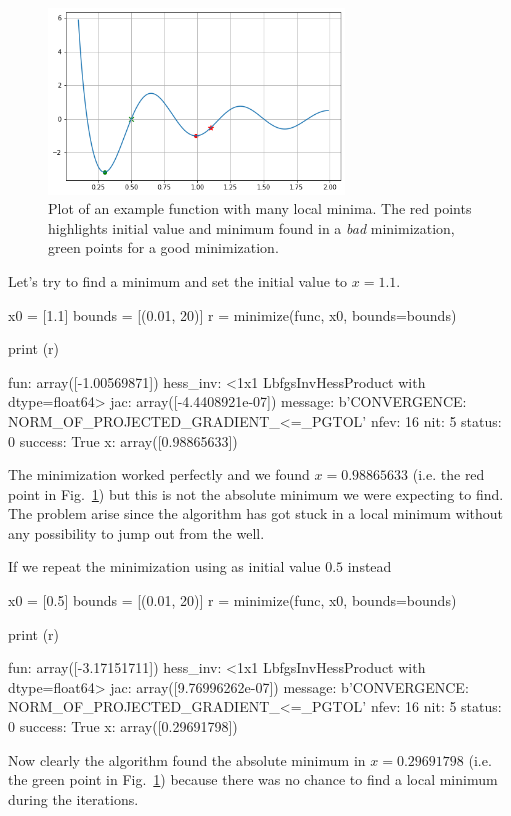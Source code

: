 \begin{figure}[htb]
	\centering
	\includegraphics[width=0.7\textwidth]{figures/local_minima.png}
	\caption{Plot of an example function with many local minima. The red points highlights initial value and minimum found in a \emph{bad} minimization, green points for a good minimization.}
	\label{fig:local_minima}
\end{figure}
Let's try to find a minimum and set the initial value to $x=1.1$.
\begin{ipython}
x0 = [1.1]
bounds = [(0.01, 20)]
r = minimize(func, x0, bounds=bounds)

print (r)
\end{ipython}
\begin{ioutput}
     fun: array([-1.00569871])
hess_inv: <1x1 LbfgsInvHessProduct with dtype=float64>
     jac: array([-4.4408921e-07])
 message: b'CONVERGENCE: NORM_OF_PROJECTED_GRADIENT_<=_PGTOL'
    nfev: 16
     nit: 5
  status: 0
 success: True
       x: array([0.98865633])
\end{ioutput}
The minimization worked perfectly and we found $x=0.98865633$ (i.e. the red point in Fig.~\ref{fig:local_minima}) but this is not the absolute minimum we were expecting to find. The problem arise since the algorithm has got stuck in a local minimum without any possibility to jump out from the well.

If we repeat the minimization using as initial value $0.5$ instead
\begin{ipython}
x0 = [0.5]
bounds = [(0.01, 20)]
r = minimize(func, x0, bounds=bounds)

print (r)
\end{ipython}
\begin{ioutput}
     fun: array([-3.17151711])
hess_inv: <1x1 LbfgsInvHessProduct with dtype=float64>
     jac: array([9.76996262e-07])
 message: b'CONVERGENCE: NORM_OF_PROJECTED_GRADIENT_<=_PGTOL'
    nfev: 16
     nit: 5
  status: 0
 success: True
       x: array([0.29691798])
\end{ioutput}
Now clearly the algorithm found the absolute minimum in $x=0.29691798$ (i.e. the green point in Fig.~\ref{fig:local_minima}) because there was no chance to find a local minimum during the iterations.

